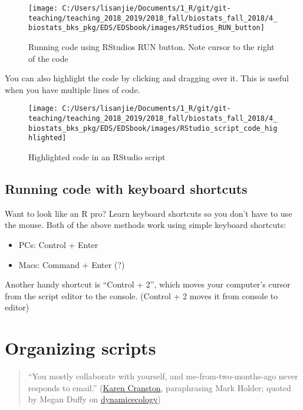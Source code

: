 \documentclass[]{book}
\providecommand{\tightlist}{%
  \setlength{\itemsep}{0pt}\setlength{\parskip}{0pt}}
\theoremstyle{definition}
\theoremstyle{definition}
\theoremstyle{definition}
\theoremstyle{remark}
\begin{document}
\begin{figure}
\texttt{[image: C:/Users/lisanjie/Documents/1\_R/git/git-teaching/teaching\_2018\_2019/2018\_fall/biostats\_fall\_2018/4\_biostats\_bks\_pkg/EDS/EDSbook/images/RStudios\_RUN\_button]} \caption{Running code using RStudios RUN button.  Note cursor to the right of the code}\label{fig:unnamed-chunk-25}
\end{figure}

You can also highlight the code by clicking and dragging over it. This
is useful when you have multiple lines of code.

\begin{figure}
\texttt{[image: C:/Users/lisanjie/Documents/1\_R/git/git-teaching/teaching\_2018\_2019/2018\_fall/biostats\_fall\_2018/4\_biostats\_bks\_pkg/EDS/EDSbook/images/RStudio\_script\_code\_highlighted]} \caption{Highlighted code in an RStudio script}\label{fig:unnamed-chunk-26}
\end{figure}

\subsection{Running code with keyboard
shortcuts}\label{running-code-with-keyboard-shortcuts}

Want to look like an R pro? Learn keyboard shortcuts so you don't have
to use the mouse. Both of the above methods work using simple keyboard
shortcuts:

\begin{itemize}
\tightlist
\item
  PCs: Control + Enter
\item
  Macs: Command + Enter (?)
\end{itemize}

Another handy shortcut is ``Control + 2'', which moves your computer's
cursor from the script editor to the console. (Control + 2 moves it from
console to editor)

\section{Organizing scripts}\label{organizing-scripts}

\begin{quote}
``You mostly collaborate with yourself, and me-from-two-months-ago never
responds to email.''
(\href{https://twitter.com/kcranstn/statuses/370914072511791104}{Karen
Cranston}, paraphrasing Mark Holder; quoted by Megan Duffy on
\href{https://dynamicecology.wordpress.com/2015/02/18/the-biggest-benefit-of-my-shift-to-r-reproducibility/}{dynamicecology})
\end{quote}
\end{document}
